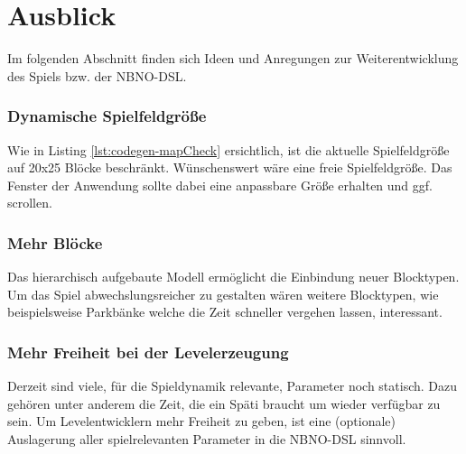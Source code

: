 \section{Ausblick}

Im folgenden Abschnitt finden sich Ideen und Anregungen zur Weiterentwicklung des Spiels bzw. der NBNO-DSL.

\subsubsection{Dynamische Spielfeldgröße}
Wie in Listing \ref{lst:codegen-mapCheck} ersichtlich, ist die aktuelle Spielfeldgröße auf 20x25 Blöcke beschränkt.
Wünschenswert wäre eine freie Spielfeldgröße.
Das Fenster der Anwendung sollte dabei eine anpassbare Größe erhalten und ggf. scrollen.

\subsubsection{Mehr Blöcke}
Das hierarchisch aufgebaute Modell ermöglicht die Einbindung neuer Blocktypen.
Um das Spiel abwechslungsreicher zu gestalten wären weitere Blocktypen, wie beispielsweise Parkbänke welche die Zeit schneller vergehen lassen, interessant.

\subsubsection{Mehr Freiheit bei der Levelerzeugung}
Derzeit sind viele, für die Spieldynamik relevante, Parameter noch statisch.
Dazu gehören unter anderem die Zeit, die ein Späti braucht um wieder verfügbar zu sein.
Um Levelentwicklern mehr Freiheit zu geben, ist eine (optionale) Auslagerung aller spielrelevanten Parameter in die NBNO-DSL sinnvoll.